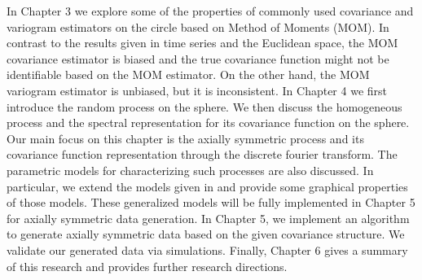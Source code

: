 In Chapter 3 we explore some of the properties of commonly used covariance and variogram estimators on the circle based on Method of Moments (MOM). In contrast to the results given in time series and the Euclidean space, the MOM covariance estimator is biased and the true covariance function might not be identifiable based on the MOM estimator. On the other hand, the MOM variogram estimator is unbiased, but it is inconsistent. In Chapter 4 we first introduce the random process on the sphere. We then discuss the homogeneous process and the spectral representation for its covariance function on the sphere. Our main focus on this chapter is the axially symmetric process and its covariance function representation through the discrete fourier transform. The parametric models for characterizing such processes are also discussed. In particular, we extend the models given in \cite{Huang2012} and provide some graphical properties of those models. These generalized models will be fully implemented in Chapter 5 for axially symmetric data generation. In Chapter 5, we implement an algorithm to generate axially symmetric data based on the given covariance structure. We validate our generated data via simulations. Finally, Chapter 6 gives a summary of this research and provides further research directions.



